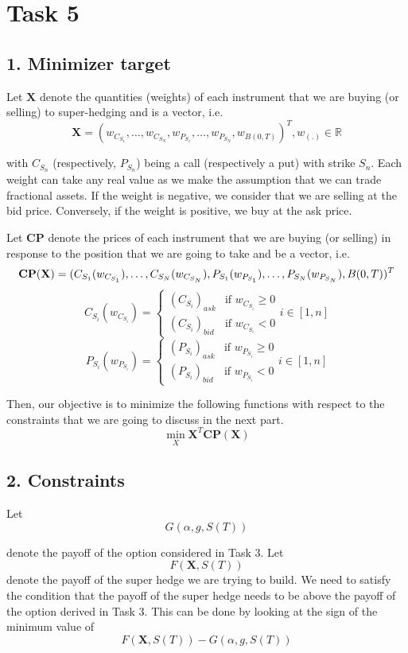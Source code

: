 \newpage
\section*{Task 5}
\subsection*{1. Minimizer target}
Let $\mathbf{X}$ denote the quantities (weights) of each instrument that we are buying (or selling) to super-hedging and is a vector, i.e.
\[\mathbf{X} = (w_{C_{S_1}}, \dots, w_{C_{S_N}}, w_{P_{S_1}}, \dots, w_{P_{S_N}}, w_{B(0,T)})^T, w_{(.)} \in \mathbb{R}\]

with $C_{S_n}$ (respectively, $P_{S_n}$) being a call (respectively a put) with strike $S_n$. Each weight can take any real value as we make the assumption that we can trade fractional assets. If the weight is negative, we consider that we are selling at the bid price. Conversely, if the weight is positive, we buy at the ask price.

Let $\mathbf{CP}$ denote the prices of each instrument that we are buying (or selling) in response to the position that we are going to take and be a vector, i.e.
\[\mathbf{CP}(\mathbf{X}) = ({C_{S_1}}(w_{C_{S_1}}), \dots, {C_{S_N}}(w_{C_{S_N}}), {P_{S_1}}(w_{P_{S_1}}), \dots, {P_{S_N}}(w_{P_{S_N}}), {B(0,T)})^T \\
\]
$$
{C_{S_i}}(w_{C_{S_i}}) =
\begin{cases} 
    (C_{S_i})_{ask} & \text{if } w_{C_{S_i}} \geq 0 \\ 
    (C_{S_i})_{bid} & \text{if } w_{C_{S_i}} < 0
\end{cases}
i \in [1,n]
$$
$$
{P_{S_i}}(w_{P_{S_i}}) =
\begin{cases} 
    (P_{S_i})_{ask} & \text{if } w_{P_{S_i}} \geq 0 \\ 
    (P_{S_i})_{bid} & \text{if } w_{P_{S_i}} < 0
\end{cases}
i \in [1,n]
$$

Then, our objective is to minimize the following functions with respect to the constraints that we are going to discuss in the next part.
\[
\min_{X}\mathbf{X}^T\mathbf{CP}(\mathbf{X})
\]

\subsection*{2. Constraints}
Let
\[G(\alpha, g, S(T))\]

denote the payoff of the option considered in Task 3. Let $$F(\mathbf{X}, S(T))$$ denote the payoff of the super hedge we are trying to build. We need to satisfy the condition that the payoff of the super hedge needs to be above the payoff of the option derived in Task 3. This can be done by looking at the sign of the minimum value of
\[F(\mathbf{X}, S(T)) - G(\alpha, g, S(T))\]

